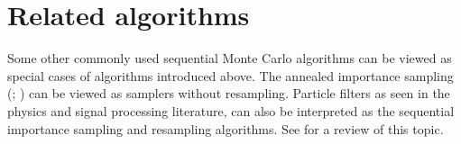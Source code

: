 \section{Related algorithms}
\label{sec:Related algorithms}

Some other commonly used sequential Monte Carlo algorithms can be viewed as
special cases of algorithms introduced above. The annealed importance sampling
(\ais; \textcite{Neal:2001we}) can be viewed as \smc samplers without
resampling. Particle filters as seen in the physics and signal processing
literature, can also be interpreted as the sequential importance sampling and
resampling algorithms. See \textcite{Doucet:2011us} for a review of this topic.

